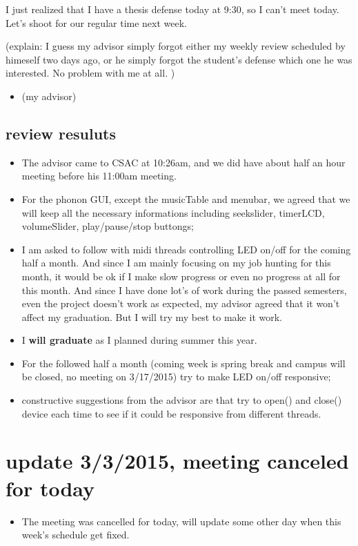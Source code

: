 \documentclass[9pt,b5paper]{article}
\begin{document}
I just realized that I have a thesis defense today at 9:30, so I can't meet today. Let's shoot for our regular time next week.

(explain: I guess my advisor simply forgot either my weekly review scheduled by himeself two days ago, or he simply forgot the student's defense which one he was interested. No problem with me at all. )

\begin{itemize}
\item (my advisor)
\end{itemize}
\subsection{review resuluts}
\label{sec-2-4}
\begin{itemize}
\item The advisor came to CSAC at 10:26am, and we did have about half an hour meeting before his 11:00am meeting.
\item For the phonon GUI, except the musicTable and menubar, we agreed that we will keep all the necessary informations including seekslider, timerLCD, volumeSlider, play/pause/stop buttongs;
\item I am asked to follow with midi threads controlling LED on/off for the coming half a month. And since I am mainly focusing on my job hunting for this month, it would be ok if I make slow progress or even no progress at all for this month. And since I have done lot's of work during the passed semesters, even the project doesn't work as expected, my advisor agreed that it won't affect my graduation. But I will try my best to make it work.
\item I \textbf{will graduate} as I planned during summer this year.
\item For the followed half a month (coming week is spring break and campus will be closed, no meeting on 3/17/2015) try to make LED on/off responsive;
\item constructive suggestions from the advisor are that try to open() and close() device each time to see if it could be responsive from different threads.
\end{itemize}

\section{update 3/3/2015, meeting canceled for today}
\label{sec-3}
\begin{itemize}
\item The meeting was cancelled for today, will update some other day when this week's schedule get fixed.
\end{itemize}
\end{document}

